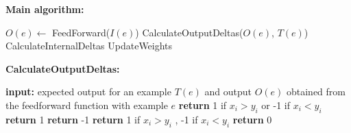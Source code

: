 \documentclass[11pt]{article}
\newcommand{\daniel}[1]{{\textbf{{\small{\color{magenta}DL}: #1{\color{magenta}$\circ$}}}}}
\newcommand{\owen}[1]{\textbf{{\small{\color{red}OK}: #1{\color{red}$\circ$}}}}
\begin{document}
\begin{algorithm}
{
	\textbf{Main algorithm:}
\begin{algorithmic}[1]
		\STATE $O(e) \gets$ FeedForward($I(e)$)
		\STATE CalculateOutputDeltas($O(e)$, $T(e)$)
		\STATE CalculateInternalDeltas
		\STATE UpdateWeights
	\ENDFOR
\end{algorithmic}
}
\textbf{CalculateOutputDeltas:}
{
\begin{algorithmic}[1]
\STATE \textbf{input:} expected output for an example $T(e)$ and output $O(e)$ obtained from the feedforward function with example $e$ 
\STATE \textbf{return} 1 if $x_i>y_i$ or -1 if $x_i<y_i$
\STATE \textbf{return} 1
\STATE \textbf{return} -1
\ENDIF
\ENDFOR
{}
\STATE \textbf{return} 1 if $x_i>y_i$ , -1 if $x_i<y_i$
\ENDFOR
\STATE \textbf{return} 0 
\end{algorithmic}
}
\caption{\label{algo:dcsort}The Backpropagation Training Algorithm %
}

\end{algorithm}





\end{document}

